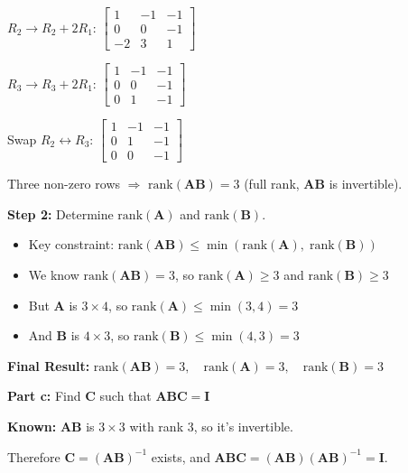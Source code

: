 \documentclass{article}
\begin{document}
\begin{aprob}
    $R_2 \to R_2 + 2R_1$:
    $\begin{bmatrix} 1 & -1 & -1 \\ 0 & 0 & -1 \\ -2 & 3 & 1 \end{bmatrix}$

    $R_3 \to R_3 + 2R_1$:
    $\begin{bmatrix} 1 & -1 & -1 \\ 0 & 0 & -1 \\ 0 & 1 & -1 \end{bmatrix}$

    Swap $R_2 \leftrightarrow R_3$:
    $\begin{bmatrix} 1 & -1 & -1 \\ 0 & 1 & -1 \\ 0 & 0 & -1 \end{bmatrix}$

    Three non-zero rows $\Rightarrow$ $\text{rank}(\mathbf{AB}) = 3$ (full rank, $\mathbf{AB}$ is invertible).

    \medskip
    \textbf{Step 2:} Determine $\text{rank}(\mathbf{A})$ and $\text{rank}(\mathbf{B})$.
    \begin{itemize}
        \item Key constraint: $\text{rank}(\mathbf{AB}) \leq \min(\text{rank}(\mathbf{A}),\; \text{rank}(\mathbf{B}))$
        \item We know $\text{rank}(\mathbf{AB}) = 3$, so $\text{rank}(\mathbf{A}) \geq 3$ and $\text{rank}(\mathbf{B}) \geq 3$
        \item But $\mathbf{A}$ is $3 \times 4$, so $\text{rank}(\mathbf{A}) \leq \min(3,4) = 3$
        \item And $\mathbf{B}$ is $4 \times 3$, so $\text{rank}(\mathbf{B}) \leq \min(4,3) = 3$
    \end{itemize}

    \textbf{Final Result:} $\boxed{\text{rank}(\mathbf{AB}) = 3, \quad \text{rank}(\mathbf{A}) = 3, \quad \text{rank}(\mathbf{B}) = 3}$

    \bigskip
    \begin{mdframed}
    \textbf{\large Part c:} Find $\mathbf{C}$ such that $\mathbf{ABC} = \mathbf{I}$
    \end{mdframed}

    \textbf{Known:} $\mathbf{AB}$ is $3 \times 3$ with rank 3, so it's invertible.

    Therefore $\mathbf{C} = (\mathbf{AB})^{-1}$ exists, and $\mathbf{ABC} = (\mathbf{AB})(\mathbf{AB})^{-1} = \mathbf{I}$.


\end{aprob}
\end{document}
